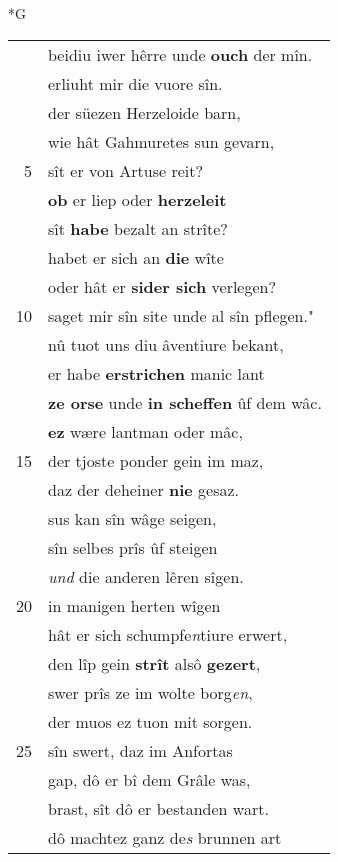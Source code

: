 \documentclass[8pt,a4paper,notitlepage]{article}
\begin{document}
\newpage
\begin{table}[ht]
\begin{minipage}[t]{0.5\linewidth}
\small
\begin{center}*G
\end{center}
\begin{tabular}{rl}
 & beidiu iwer hêrre unde \textbf{ouch} der mîn.\\ 
 & erliuht mir die vuore sîn.\\ 
 & der süezen Herzeloide barn,\\ 
 & wie hât Gahmuretes sun gevarn,\\ 
5 & sît er von Artuse reit?\\ 
 & \textbf{ob} er liep oder \textbf{herzeleit}\\ 
 & sît \textbf{habe} bezalt an strîte?\\ 
 & habet er sich an \textbf{die} wîte\\ 
 & oder hât er \textbf{sider sich} verlegen?\\ 
10 & saget mir sîn site unde al sîn pflegen."\\ 
 & nû tuot uns diu âventiure bekant,\\ 
 & er habe \textbf{erstrichen} manic lant\\ 
 & \textbf{ze orse} unde \textbf{in scheffen} ûf dem wâc.\\ 
 & \textbf{ez} wære lantman oder mâc,\\ 
15 & der tjoste ponder gein im maz,\\ 
 & daz der deheiner \textbf{nie} gesaz.\\ 
 & sus kan sîn wâge seigen,\\ 
 & sîn selbes prîs ûf steigen\\ 
 & \textit{und} die anderen lêren sîgen.\\ 
20 & in manigen herten wîgen\\ 
 & hât er sich schumpfe\textit{n}tiure erwert,\\ 
 & den lîp gein \textbf{strît} alsô \textbf{gezert},\\ 
 & swer prîs ze im wolte borg\textit{en},\\ 
 & der muos ez tuon mit sorgen.\\ 
25 & sîn swert, daz im Anfortas\\ 
 & gap, dô er bî dem Grâle was,\\ 
 & brast, sît dô er bestanden wart.\\ 
 & dô machtez ganz de\textit{s} brunnen art\\ 

\end{tabular}
\end{minipage}
\end{table}
\end{document}
